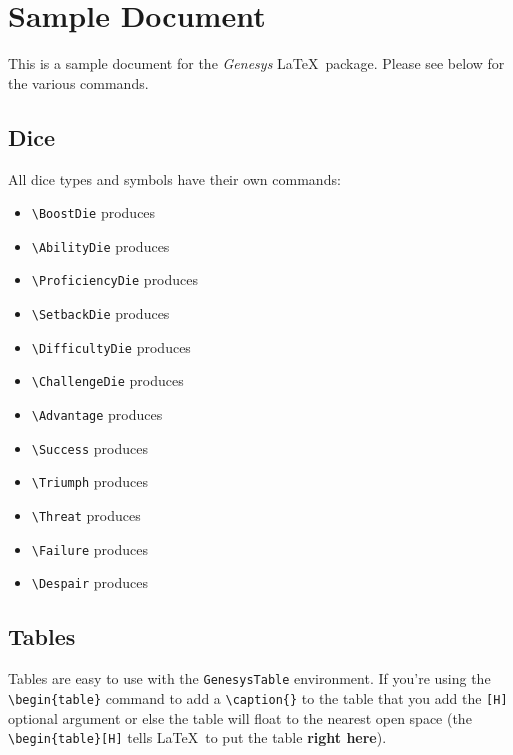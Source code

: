 \documentclass{book}
\begin{document}
\chapter{Sample Document}

This is a sample document for the \emph{Genesys} \LaTeX\ package. Please see below for the various commands.

\section{Dice}

All dice types and symbols have their own commands:

\begin{multicols}{2}

\begin{itemize}[noitemsep,nolistsep]
\item \verb|\BoostDie| produces \BoostDie
\item \verb|\AbilityDie| produces \AbilityDie
\item \verb|\ProficiencyDie| produces \ProficiencyDie
\item \verb|\SetbackDie| produces \SetbackDie
\item \verb|\DifficultyDie| produces \DifficultyDie
\item \verb|\ChallengeDie| produces \ChallengeDie
\item \verb|\Advantage| produces \Advantage
\item \verb|\Success| produces \Success
\item \verb|\Triumph| produces \Triumph
\item \verb|\Threat| produces \Threat
\item \verb|\Failure| produces \Failure
\item \verb|\Despair| produces \Despair
\end{itemize}

\end{multicols}

\section{Tables}

Tables are easy to use with the \verb|GenesysTable| environment. If you're using the \verb|\begin{table}| command to add a \verb|\caption{}| to the table that you add the \verb|[H]| optional argument or else the table will float to the nearest open space (the \verb|\begin{table}[H]| tells \LaTeX\ to put the table \textbf{right here}).
\end{document}
